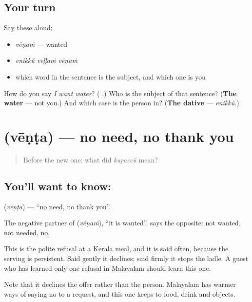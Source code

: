 \subsection*{Your turn}
Say these aloud:

\begin{itemize}
\raggedright
  \item \emph{vēṇaṁ} — wanted
  \item \emph{enikkŭ veḷḷaṁ vēṇaṁ}
  \item which word in the sentence is the subject, and which one is you
\end{itemize}

\begin{tcolorbox}[breakable,colback=teal!4,colframe=teal!35!black,title={Before you move on}]
How do you say \emph{I want water}? (\emph{\textbf{  }}.) Who is the subject of that sentence? (\textbf{The water} — not you.) And which case is the person in? (\textbf{The dative} — \emph{enikkŭ}.)
\end{tcolorbox}
\section[\texorpdfstring{\ml{വേണ്ട} (vēṇṭa)}{വേണ്ട (vēṇṭa)}]{ (vēṇṭa) — no need, no thank you}

\label{lesson:ML-C58-no-need}



\begin{quote}
Before the new one: what did \emph{kuṟaccŭ} mean?
\end{quote}

\subsection*{You'll want to know: }
\textbf{} (\emph{vēṇṭa}) — \textquotedblleft{}no need, no thank you\textquotedblright{}.

The negative partner of  (\emph{vēṇaṁ}), \textquotedblleft{}it is wanted\textquotedblright{}.  says the opposite: not wanted, not needed, no.

This is the polite refusal at a Kerala meal, and it is said often, because the serving is persistent. Said gently it declines; said firmly it stops the ladle. A guest who has learned only one refusal in Malayalam should learn this one.

Note that it declines the offer rather than the person. Malayalam has warmer ways of saying no to a request, and this one keeps to food, drink and objects.

